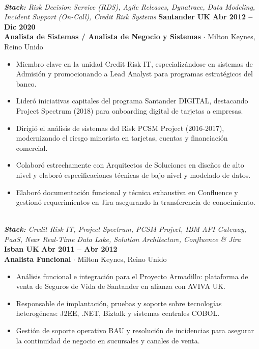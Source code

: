 \documentclass[10pt,a4paper]{article}
\begin{document}
\\\noindent\textit{\footnotesize \textbf{Stack:} Risk Decision Service (RDS), Agile Releases, Dynatrace, Data Modeling, Incident Support (On-Call), Credit Risk Systems}
\vspace{10pt}
\noindent\textbf{\large Santander UK} \hfill {\color{SynthBlue}\textbf{Abr 2012 -- Dic 2020}} \\
{\color{SynthPink}\textbf{Analista de Sistemas / Analista de Negocio y Sistemas}} $\cdot$ {\color{SlateGray}Milton Keynes, Reino Unido}
\begin{itemize}[leftmargin=1.5em, itemsep=1.5pt, topsep=2pt]
    \item Miembro clave en la unidad Credit Risk IT, especializándose en sistemas de Admisión y promocionando a Lead Analyst para programas estratégicos del banco.
    \item Lideró iniciativas capitales del programa Santander DIGITAL, destacando Project Spectrum (2018) para onboarding digital de tarjetas a empresas.
    \item Dirigió el análisis de sistemas del Risk PCSM Project (2016-2017), modernizando el riesgo minorista en tarjetas, cuentas y financiación comercial.
    \item Colaboró estrechamente con Arquitectos de Soluciones en diseños de alto nivel y elaboró especificaciones técnicas de bajo nivel y modelado de datos.
    \item Elaboró documentación funcional y técnica exhaustiva en Confluence y gestionó requerimientos en Jira asegurando la transferencia de conocimiento.
\end{itemize}
\\\noindent\textit{\footnotesize \textbf{Stack:} Credit Risk IT, Project Spectrum, PCSM Project, IBM API Gateway, PaaS, Near Real-Time Data Lake, Solution Architecture, Confluence \& Jira}
\vspace{10pt}
\noindent\textbf{\large Isban UK} \hfill {\color{SynthBlue}\textbf{Abr 2011 -- Abr 2012}} \\
{\color{SynthPink}\textbf{Analista Funcional}} $\cdot$ {\color{SlateGray}Milton Keynes, Reino Unido}
\begin{itemize}[leftmargin=1.5em, itemsep=1.5pt, topsep=2pt]
    \item Análisis funcional e integración para el Proyecto Armadillo: plataforma de venta de Seguros de Vida de Santander en alianza con AVIVA UK.
    \item Responsable de implantación, pruebas y soporte sobre tecnologías heterogéneas: J2EE, .NET, Biztalk y sistemas centrales COBOL.
    \item Gestión de soporte operativo BAU y resolución de incidencias para asegurar la continuidad de negocio en sucursales y canales de venta.
\end{itemize}
\end{document}
